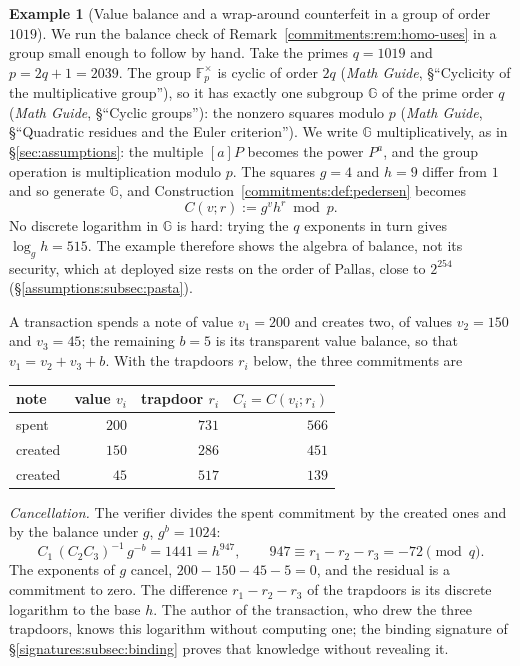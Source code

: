 \documentclass[11pt,a4paper]{article}
\theoremstyle{definition}
\newtheorem{example}[theorem]{Example}
\theoremstyle{remark}
\newcommand{\F}{\ensuremath{\mathbb{F}}}
\newcommand{\G}{\ensuremath{\mathbb{G}}}
\begin{document}
\begin{example}[Value balance and a wrap-around counterfeit in a group of
order \(1019\)]
\label{ex:pedersen-toy}
We run the balance check of Remark~\ref{commitments:rem:homo-uses} in a
group small enough to follow by hand. Take the primes \(q = 1019\) and
\(p = 2q + 1 = 2039\). The group \(\F_{p}^{\times}\) is cyclic of order
\(2q\) (\emph{Math Guide}, \S``Cyclicity of the multiplicative group''),
so it has exactly one subgroup \(\G\) of the prime order \(q\)
(\emph{Math Guide}, \S``Cyclic groups''): the nonzero squares modulo
\(p\) (\emph{Math Guide}, \S``Quadratic residues and the Euler
criterion''). We write \(\G\) multiplicatively, as in
\S\ref{sec:assumptions}: the multiple \([a]P\) becomes the power
\(P^{a}\), and the group operation is multiplication modulo \(p\). The
squares \(g = 4\) and \(h = 9\) differ from \(1\) and so generate \(\G\),
and Construction~\ref{commitments:def:pedersen} becomes
\[
C(v; r) := g^{v} h^{r} \bmod p .
\]
No discrete logarithm in \(\G\) is hard: trying the \(q\) exponents in
turn gives \(\log_g h = 515\). The example therefore shows the algebra of
balance, not its security, which at deployed size rests on the order of
Pallas, close to \(2^{254}\) (\S\ref{assumptions:subsec:pasta}).

A transaction spends a note of value \(v_1 = 200\) and creates two, of
values \(v_2 = 150\) and \(v_3 = 45\); the remaining \(b = 5\) is its
transparent value balance, so that \(v_1 = v_2 + v_3 + b\). With the
trapdoors \(r_i\) below, the three commitments are
\begin{center}
\begin{tabular}{@{}lrrr@{}}
\toprule
note & value \(v_i\) & trapdoor \(r_i\) & \(C_i = C(v_i; r_i)\) \\
\midrule
spent & \(200\) & \(731\) & \(566\) \\
created & \(150\) & \(286\) & \(451\) \\
created & \(45\) & \(517\) & \(139\) \\
\bottomrule
\end{tabular}
\end{center}

\emph{Cancellation.} The verifier divides the spent commitment by the
created ones and by the balance under \(g\), \(g^{b} = 1024\):
\[
C_1\, (C_2 C_3)^{-1}\, g^{-b} = 1441 = h^{947},
\qquad
947 \equiv r_1 - r_2 - r_3 = -72 \pmod q .
\]
The exponents of \(g\) cancel, \(200 - 150 - 45 - 5 = 0\), and the
residual is a commitment to zero. The difference \(r_1 - r_2 - r_3\) of
the trapdoors is its discrete logarithm to the base \(h\). The author of
the transaction, who drew the three trapdoors, knows this logarithm
without computing one; the binding signature of
\S\ref{signatures:subsec:binding} proves that knowledge without
revealing it.


\end{example}
\end{document}
